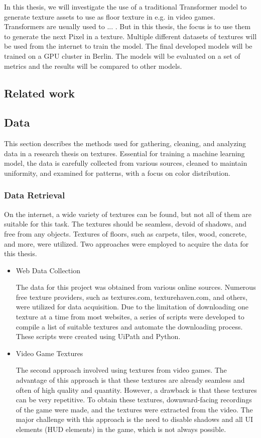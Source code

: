 
In this thesis, we will investigate the use of a traditional Transformer model to generate texture assets to use as floor texture in e.g. in video games. Transformers are usually used to ... . But in this thesis, the focus is to use them to generate the next Pixel in a texture. Multiple different datasets of textures will be used from the internet to train the model. The final developed models will be trained on a GPU cluster in Berlin. The models will be evaluated on a set of metrics and the results will be compared to other models.

\subsection{Related work}
    
\subsection{Data}
    
This section describes the methods used for gathering, cleaning, and analyzing data in a research thesis on textures. Essential for training a machine learning model, the data is carefully collected from various sources, cleaned to maintain uniformity, and examined for patterns, with a focus on color distribution.


\subsubsection{Data Retrieval}
On the internet, a wide variety of textures can be found, but not all of them are suitable for this task. The textures should be seamless, devoid of shadows, and free from any objects. Textures of floors, such as carpets, tiles, wood, concrete, and more, were utilized. Two approaches were employed to acquire the data for this thesis.

\begin{itemize}
    \item Web Data Collection

    The data for this project was obtained from various online sources. Numerous free texture providers, such as textures.com, texturehaven.com, and others, were utilized for data acquisition. Due to the limitation of downloading one texture at a time from most websites, a series of scripts were developed to compile a list of suitable textures and automate the downloading process. These scripts were created using UiPath and Python.
    
    \item Video Game Textures
    
    The second approach involved using textures from video games. The advantage of this approach is that these textures are already seamless and often of high quality and quantity. However, a drawback is that these textures can be very repetitive. To obtain these textures, downward-facing recordings of the game were made, and the textures were extracted from the video. The major challenge with this approach is the need to disable shadows and all UI elements (HUD elements) in the game, which is not always possible.
\end{itemize}

